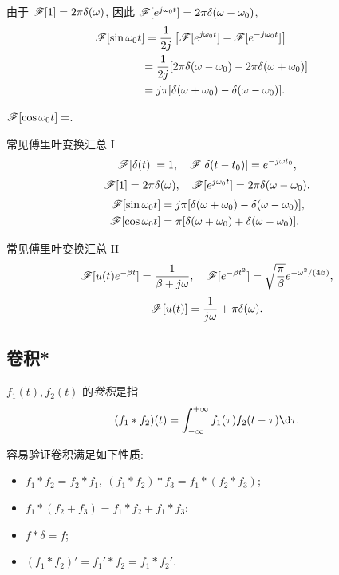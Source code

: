 \begin{solution}
		由于 $\mathscr{F}[1]=2\pi\delta(\omega)$,
	{因此 $\mathscr{F}[e^{j\omega_0t}]=2\pi\delta(\omega-\omega_0)$,
	}
	{\begin{align*}
			\mathscr{F}[\sin{\omega_0 t}]&=\frac1{2j}\left[\mathscr{F}[e^{j\omega_0t}]-\mathscr{F}[e^{-j\omega_0t}]\right]&\\
			&{=\frac1{2j}[2\pi\delta(\omega-\omega_0)-2\pi\delta(\omega+\omega_0)]}&\\
			&{=j\pi[\delta(\omega+\omega_0)-\delta(\omega-\omega_0)].}
		\end{align*}
	}
\end{solution}

\begin{exercise}
	$\mathscr{F}[\cos{\omega_0 t}]=$.
\end{exercise}

\begin{theorem}{常见傅里叶变换汇总 I}
	\[\mathscr{F}[\delta(t)]=1,\quad \mathscr{F}[\delta(t-t_0)]=e^{-j\omega t_0},\]
	\[\mathscr{F}[1]=2\pi\delta(\omega),\quad \mathscr{F}[e^{j\omega_0 t}]=2\pi\delta(\omega-\omega_0).\]
	\begin{align*}
	\mathscr{F}[\sin \omega_0t]&=j\pi[\delta(\omega+\omega_0)-\delta(\omega-\omega_0)],\\
	\mathscr{F}[\cos{\omega_0 t}]&=\pi[\delta(\omega+\omega_0)+\delta(\omega-\omega_0)].
	\end{align*}
\end{theorem}

\begin{theorem}{常见傅里叶变换汇总 II}
	\[\mathscr{F}[u(t)e^{-\beta t}]=\dfrac1{\beta+j\omega},\quad
	\mathscr{F}[e^{-\beta t^2}]=\sqrt{\dfrac\pi\beta}e^{-\omega^2/(4\beta)},\]
	\[\mathscr{F}[u(t)]=\dfrac1{j\omega}+\pi\delta(\omega).\]
\end{theorem}

\subsection{卷积*}

\begin{definition}
	$f_1(t),f_2(t)$ 的\emph{卷积}是指
	\[(f_1\ast f_2)(t)=\int_{-\infty}^{+\infty} f_1(\tau)f_2(t-\tau)\d \tau.\]
\end{definition}

容易验证卷积满足如下性质:
\begin{itemize}
	\item $f_1\ast f_2=f_2\ast f_1,\ (f_1\ast f_2)\ast f_3=f_1\ast(f_2\ast f_3)$;
	\item $f_1\ast(f_2+f_3)=f_1\ast f_2+f_1\ast f_3$;
	\item $f\ast\delta=f$;
	\item $(f_1\ast f_2)'=f_1'\ast f_2=f_1\ast f_2'$.
\end{itemize}

